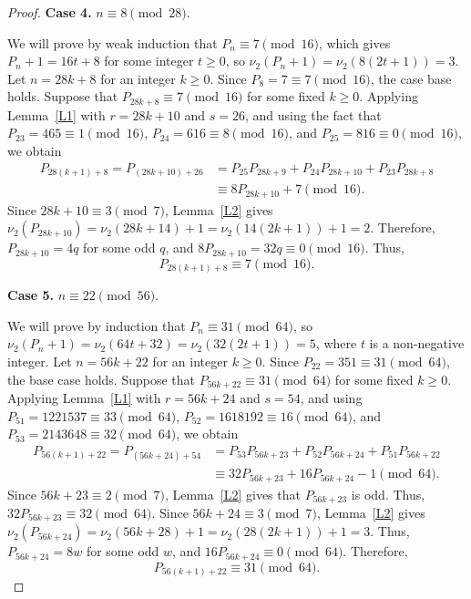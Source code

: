 \documentclass[10pt,a4paper]{amsart}
\begin{document}
\begin{proof}
	\medskip
	\noindent\textbf{Case 4.} $n\equiv 8\pmod{28}$.
	
	We will prove by weak induction that $P_n\equiv 7\pmod{16}$, which gives $P_{n}+1=16t+8$ for some integer $t\ge 0$, so 
	$\nu_2(P_n+1)=\nu_{2}(8(2t+1))=3$. Let $n=28k+8$ for an integer $k\ge 0$. Since $P_8=7\equiv 7\pmod{16}$, the case base holds. Suppose that $P_{28k+8}\equiv 7\pmod{16}$ for some fixed $k\ge 0$. Applying 
	Lemma~\ref{L1} with $r=28k+10$ and $s=26$, and using the fact that
	$P_{23}=465\equiv 1\pmod{16}$, $P_{24}=616\equiv 8\pmod{16}$, and $P_{25}=816\equiv 0\pmod{16}$, 
	we obtain
	\begin{align*}
		P_{28(k+1)+8} = P_{(28k+10)+26}
		&= P_{25}P_{28k+9}+P_{24}P_{28k+10}
		+P_{23}P_{28k+8}\\
		&\equiv 8P_{28k+10}+7\pmod{16}.
	\end{align*}
	Since $28k+10\equiv 3\pmod{7}$, Lemma~\ref{L2} gives 
	$\nu_2(P_{28k+10})=\nu_2(28k+14)+1=\nu_2(14(2k+1))+1=2$. Therefore, $P_{28k+10}=4q$ for 
	some odd $q$, and 
	$8P_{28k+10}=32q\equiv 0\pmod{16}$. Thus,
	\begin{equation*}
		P_{28(k+1)+8}\equiv 7\pmod{16}.
	\end{equation*}
	
	\medskip
	\noindent\textbf{Case 5.} $n\equiv 22\pmod{56}$.
	
	We will prove by induction that $P_n\equiv 31\pmod{64}$, so
	$\nu_2(P_n+1)=\nu_{2}(64t+32)=\nu_{2}(32(2t+1))=5$, where $t$ is a non-negative integer. Let $n=56k+22$ for an integer $k\ge 0$. Since $P_{22}=351\equiv 31\pmod{64}$,  the base case holds. Suppose that 
	$P_{56k+22}\equiv 31\pmod{64}$ for some fixed $k\ge 0$. Applying Lemma~\ref{L1} 
	with $r=56k+24$ and $s=54$, and using
	$P_{51}=1221537\equiv 33\pmod{64}$, $P_{52}=1618192\equiv 16\pmod{64}$, and $P_{53}=2143648\equiv 32\pmod{64}$, we obtain
	\begin{align*}
		P_{56(k+1)+22} = P_{(56k+24)+54}
		&= P_{53}P_{56k+23}+P_{52}P_{56k+24}
		+P_{51}P_{56k+22}\\
		&\equiv 32P_{56k+23}+16P_{56k+24}
		-1\pmod{64}.
	\end{align*}
Since $56k+23\equiv 2\pmod{7}$, Lemma~\ref{L2} gives that $P_{56k+23}$ is odd. Thus, $32P_{56k+23}\equiv 32\pmod{64}$. Since $56k+24\equiv 3\pmod{7}$, Lemma~\ref{L2} gives $\nu_2(P_{56k+24})=\nu_2(56k+28)+1=\nu_2(28(2k+1))+1=3$. Thus, $P_{56k+24}=8w$ for some odd $w$, and $16P_{56k+24}\equiv 0\pmod{64}$. Therefore,
	\begin{equation*}
		P_{56(k+1)+22}\equiv 31\pmod{64}.
	\end{equation*}
	

\end{proof}
\end{document}
